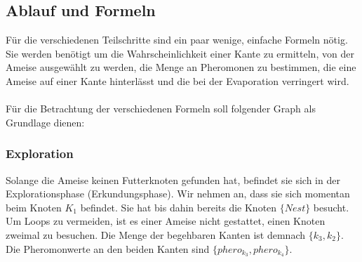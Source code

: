\subsection{Ablauf und Formeln}

Für die verschiedenen Teilschritte sind ein paar wenige, einfache Formeln nötig. Sie werden benötigt um die Wahrscheinlichkeit einer Kante zu ermitteln, von der Ameise ausgewählt zu werden, die Menge an Pheromonen zu bestimmen, die eine Ameise auf einer Kante hinterlässt und die bei der Evaporation verringert wird.

\paragraph*{}
Für die Betrachtung der verschiedenen Formeln soll folgender Graph als Grundlage dienen:

\paragraph*{}

\subsubsection*{Exploration}

Solange die Ameise keinen Futterknoten gefunden hat, befindet sie sich in der Explorationsphase (Erkundungsphase). Wir nehmen an, dass sie sich momentan beim Knoten $K_1$ befindet. Sie hat bis dahin bereits die Knoten $\{Nest\}$ besucht. Um Loops zu vermeiden, ist es einer Ameise nicht gestattet, einen Knoten zweimal zu besuchen. Die Menge der begehbaren Kanten ist demnach $\{k_3, k_2\}$. Die Pheromonwerte an den beiden Kanten sind $\{phero_{k_3}, phero_{k_4}\}$. 

